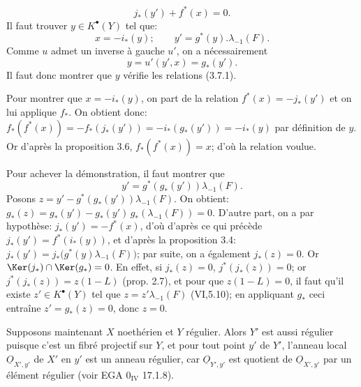 
\[
j_*(y')+f^*(x)=0.
\]
Il
faut trouver \(y\in K^{\bullet}(Y)\) tel que:
\begin{equation}\tag{3.7.1}
x=-i_*(y);\qquad y'=g^*(y).\lambda_{-1}(F).
\end{equation}
Comme \(u\) admet un inverse à gauche \(u'\), on a nécessairement
\[
y=u'(y',x)=g_*(y').
\]
Il faut donc montrer que \(y\) vérifie les relations (3.7.1).

Pour montrer que \(x=-i_*(y)\), on part de la relation \(f^*(x)=-j_*(y')\) et on lui applique \(f_*\). On obtient donc: \(f_*(f^*(x))=-f_*(j_*(y'))=-i_*(g_*(y'))=-i_*(y)\) par définition de \(y\). Or d'après la proposition 3.6, \(f_*(f^*(x))=x\); d'où la relation voulue.

Pour achever la démonstration, il faut montrer que
\[
y'=g^*(g_*(y'))\lambda_{-1}(F).
\]
Posons \(z=y'-g^*(g_*(y'))\lambda_{-1}(F)\). On obtient: \(g_*(z)=g_*(y')-g_*(y')\,g_*(\lambda_{-1}(F))=0\). D'autre part, on a par hypothèse: \(j_*(y')=-f^*(x)\), d'où d'après ce qui précède \(j_*(y')=f^*(i_*(y))\), et d'après la proposition 3.4: \(j_*(y')=j_*\bigl(g^*(y)\lambda_{-1}(F)\bigr)\); par suite, on a également \(j_*(z)=0\). Or \(\Ker(j_*)\cap\Ker(g_*)=0\). En effet, si \(j_*(z)=0\), \(j^*(j_*(z))=0\); or \(j^*(j_*(z))=z(1-L)\) (prop. 2.7), et pour que \(z(1-L)=0\), il faut qu'il existe \(z'\in K^{\bullet}(Y)\) tel que \(z=z'\lambda_{-1}(F)\) (VI,5.10); en appliquant \(g_*\) ceci entraîne \(z'=g_*(z)=0\), donc \(z=0\).

Supposons maintenant \(X\) noethérien et \(Y\) régulier. Alors \(Y'\) est aussi régulier puisque c'est un fibré projectif sur \(Y\), et pour tout point \(y'\) de \(Y'\), l'anneau local \(\underline{O}_{X',y'}\) de \(X'\) en \(y'\) est un anneau régulier, car \(\underline{O}_{Y',y'}\) est quotient de \(\underline{O}_{X',y'}\) par un élément régulier (voir EGA \(0_{\mathrm{IV}}\) 17.1.8).


